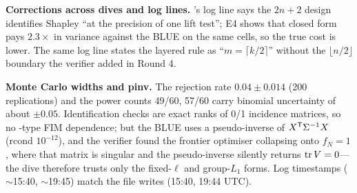 \begin{reviewernote}[(compiler)]
\textbf{Corrections across dives and log lines.} 's log line says the $2n + 2$ design identifies Shapley ``at the precision of one lift test'';  E4 shows that closed form pays $2.3\times$ in variance against the BLUE on the same cells, so the true cost is lower. The same log line states the layered rule as ``$m = \lceil k/2 \rceil$'' without the $\lfloor n/2 \rfloor$ boundary the verifier added in Round 4.

\textbf{Monte Carlo widths and pinv.} The rejection rate $0.04 \pm 0.014$ (200 replications) and the power counts 49/60, 57/60 carry binomial uncertainty of about $\pm 0.05$. Identification checks are exact ranks of 0/1 incidence matrices, so no -type FIM dependence; but the BLUE uses a pseudo-inverse of $X^{\mathsf{T}}\Sigma^{-1}X$ (rcond $10^{-12}$), and the verifier found the frontier optimiser collapsing onto $f_N = 1$, where that matrix is singular and the pseudo-inverse silently returns $\operatorname{tr} V = 0$---the dive therefore trusts only the fixed-$\ell$ and group-$L_1$ forms. Log timestamps ($\sim$15:40, $\sim$19:45) match the file writes (15:40, 19:44 UTC).
\end{reviewernote}

